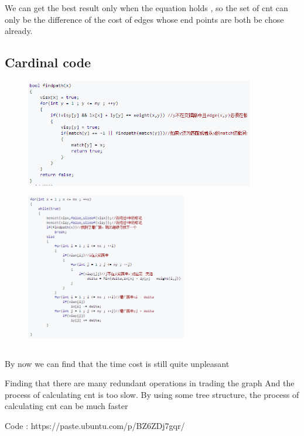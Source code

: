 \documentclass[12pt]{article}
\begin{document}
We can get the best result only when the equation holds , so the set of cnt can only be the difference of the cost of edges whose end points are both be chose already.
\subsection{Cardinal code}
\begin{figure}[!h]
  \centering
  \includegraphics[width=10cm]{3.png}\\
\end{figure}

\begin{figure}[!h]
  \centering
  \includegraphics[width=7cm]{4.png}\\
\end{figure}
\subsection{}
By now we can find that the time cost is still quite unpleasant

Finding that there are many redundant operations in trading the graph
And the process of calculating cnt is too slow.
By using some tree structure, the process of calculating cnt can be much faster

Code : https://paste.ubuntu.com/p/BZ6ZDj7gqr/
\end{document}
